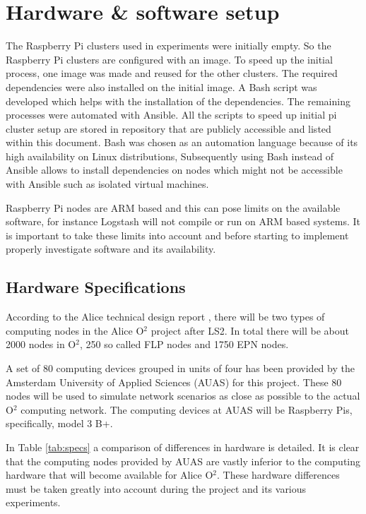 \documentclass[]{article}
\begin{document}
\section{Hardware \& software setup}
The Raspberry Pi clusters used in experiments were initially empty. So the Raspberry Pi clusters are configured with an image. To speed up the initial process, one image was made and reused for the other clusters. The required dependencies were also installed on the initial image. A Bash script was developed which helps with the installation of the dependencies. The remaining processes were automated with Ansible. All the scripts to speed up initial pi cluster setup are stored in repository that are publicly accessible and listed within this document. Bash was chosen as an automation language because of its high availability on Linux distributions, Subsequently using Bash instead of Ansible allows to install dependencies on nodes which might not be accessible with Ansible such as isolated virtual machines.

Raspberry Pi nodes are ARM based and this can pose limits on the available software, for instance Logstash will not compile or run on ARM based systems. It is important to take these limits into account and before starting to implement properly investigate software and its availability.

\subsection{Hardware Specifications}
According to the Alice technical design report \cite{Buncic:2011297}, there will be two types of computing nodes in the Alice O$^2$ project after LS2. In total there will be about 2000 nodes in O$^2$, 250 so called FLP nodes and 1750 EPN nodes.

A set of 80 computing devices grouped in units of four has been provided by the Amsterdam University of Applied Sciences (AUAS) for this project. These 80 nodes will be used to simulate network scenarios as close as possible to the actual O$^2$ computing network. The computing devices at AUAS will be Raspberry Pis, specifically, model 3 B+.

In Table \ref{tab:specs} a comparison of differences in hardware is detailed. It is clear that the computing nodes provided by AUAS are vastly inferior to the computing hardware that will become available for Alice O$^2$. These hardware differences must be taken greatly into account during the project and its various experiments.
\end{document}
